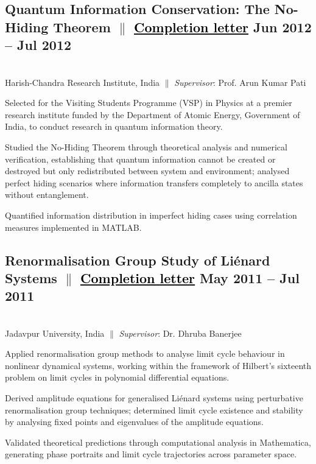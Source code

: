 

\subsection{Quantum Information Conservation: The No-Hiding Theorem $\|$
{\href{https://github.com/madhurima-nath/madhurima-nath.github.io/blob/main/docs/hri_completion_letter2012.jpg}{\underline{\textcolor{black}{Completion letter}}}} \hfill Jun 2012 -- Jul 2012}
\\
Harish-Chandra Research Institute, India $\|$
{\textit{Supervisor}}: Prof. Arun Kumar Pati
\begin{zitemize}
\item Selected for the Visiting Students Programme (VSP) in Physics at a premier research institute funded by the Department of Atomic Energy, Government of India, to conduct research in quantum information theory.
\item Studied the No-Hiding Theorem through theoretical analysis and numerical verification, establishing that quantum information cannot be created or destroyed but only redistributed between system and environment; analysed perfect hiding scenarios where information transfers completely to ancilla states without entanglement.
\item Quantified information distribution in imperfect hiding cases using correlation measures implemented in MATLAB.
\end{zitemize}


\subsection{Renormalisation Group Study of Li\'enard Systems $\|$
{\href{https://github.com/madhurima-nath/madhurima-nath.github.io/blob/main/docs/ju_completion_letter2011.pdf}{\underline{\textcolor{black}{Completion letter}}}} \hfill May 2011 -- Jul 2011}
\\
Jadavpur University, India $\|$
{\textit{Supervisor}}: Dr. Dhruba Banerjee
\begin{zitemize}
\item Applied renormalisation group methods to analyse limit cycle behaviour in nonlinear dynamical systems, working within the framework of Hilbert's sixteenth problem on limit cycles in polynomial differential equations.
\item Derived amplitude equations for generalised Li\'enard systems using perturbative renormalisation group techniques; determined limit cycle existence and stability by analysing fixed points and eigenvalues of the amplitude equations.
\item Validated theoretical predictions through computational analysis in Mathematica, generating phase portraits and limit cycle trajectories across parameter space.
\end{zitemize}
